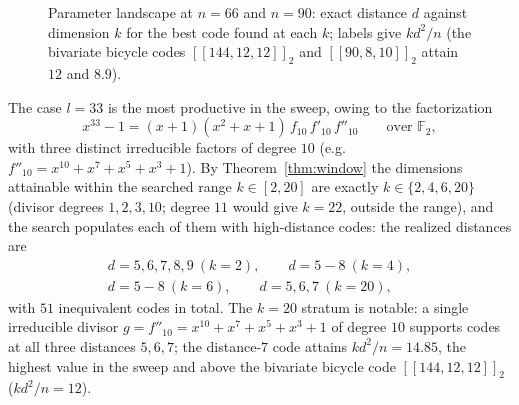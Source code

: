 \documentclass[journal,onecolumn]{IEEEtran}
\theoremstyle{definition}
\theoremstyle{remark}
\newcommand{\F}{\mathbb{F}}
\begin{document}
\begin{figure}[t]
\centering
{}
\hspace{4mm}
\caption{Parameter landscape at $n=66$ and $n=90$: exact distance $d$
against dimension $k$ for the best code found at each $k$; labels give
$kd^2/n$ (the bivariate bicycle codes $[[144,12,12]]_2$ and
$[[90,8,10]]_2$ attain $12$ and $8.9$).}
\label{fig:landscape}
\end{figure}

The case $l=33$ is the most productive in the sweep, owing to the
factorization
\[
x^{33}-1=(x+1)(x^{2}+x+1)\,f_{10}\,f'_{10}\,f''_{10}\qquad\text{over }\F_2,
\]
with three distinct irreducible factors of degree $10$
(e.g.\ $f''_{10}=x^{10}+x^{7}+x^{5}+x^{3}+1$). By
Theorem~\ref{thm:window} the dimensions attainable within the searched range
$k\in[2,20]$ are exactly $k\in\{2,4,6,20\}$ (divisor degrees $1,2,3,10$;
degree $11$ would give $k=22$, outside the range), and the search
populates each of them with high-distance codes: the realized distances are
\[
\begin{gathered}
d=5,6,7,8,9\ (k{=}2),\qquad d=5\!-\!8\ (k{=}4),\\
d=5\!-\!8\ (k{=}6),\qquad d=5,6,7\ (k{=}20),
\end{gathered}
\]
with $51$ inequivalent codes in total. The $k=20$ stratum is
notable: a single irreducible divisor
$g=f''_{10}=x^{10}+x^{7}+x^{5}+x^{3}+1$ of degree $10$ supports codes at
all three distances $5,6,7$; the distance-$7$ code attains
$kd^2/n=14.85$, the highest value in the sweep and above the bivariate
bicycle code $[[144,12,12]]_2$ ($kd^2/n=12$).
\end{document}
